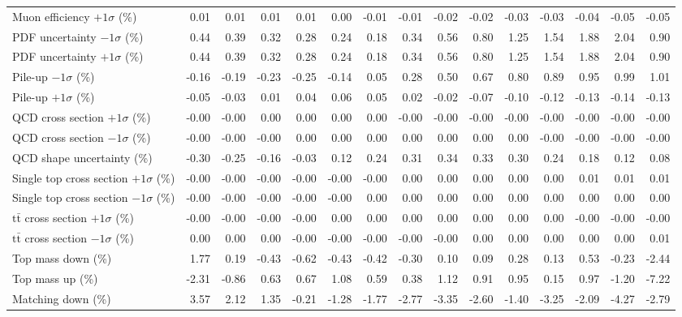 \begin{table}[htbp]
{\begin{tabular}{lrrrrrrrrrrrrrr}
Muon efficiency $+1\sigma$ (\%) & 0.01 & 0.01 & 0.01 & 0.01 & 0.00 & -0.01 & -0.01 & -0.02 & -0.02 & -0.03 & -0.03 & -0.04 & -0.05 & -0.05 \\ 
PDF uncertainty $-1\sigma$ (\%) & 0.44 & 0.39 & 0.32 & 0.28 & 0.24 & 0.18 & 0.34 & 0.56 & 0.80 & 1.25 & 1.54 & 1.88 & 2.04 & 0.90 \\ 
PDF uncertainty $+1\sigma$ (\%) & 0.44 & 0.39 & 0.32 & 0.28 & 0.24 & 0.18 & 0.34 & 0.56 & 0.80 & 1.25 & 1.54 & 1.88 & 2.04 & 0.90 \\ 
Pile-up $-1\sigma$ (\%) & -0.16 & -0.19 & -0.23 & -0.25 & -0.14 & 0.05 & 0.28 & 0.50 & 0.67 & 0.80 & 0.89 & 0.95 & 0.99 & 1.01 \\ 
Pile-up $+1\sigma$ (\%) & -0.05 & -0.03 & 0.01 & 0.04 & 0.06 & 0.05 & 0.02 & -0.02 & -0.07 & -0.10 & -0.12 & -0.13 & -0.14 & -0.13 \\ 
QCD cross section \ensuremath{+1\sigma} (\%) & -0.00 & -0.00 & 0.00 & 0.00 & 0.00 & 0.00 & -0.00 & -0.00 & -0.00 & -0.00 & -0.00 & -0.00 & -0.00 & -0.00 \\ 
QCD cross section \ensuremath{-1\sigma} (\%) & -0.00 & -0.00 & -0.00 & 0.00 & 0.00 & 0.00 & 0.00 & 0.00 & 0.00 & 0.00 & -0.00 & -0.00 & -0.00 & -0.00 \\ 
QCD shape uncertainty (\%) & -0.30 & -0.25 & -0.16 & -0.03 & 0.12 & 0.24 & 0.31 & 0.34 & 0.33 & 0.30 & 0.24 & 0.18 & 0.12 & 0.08 \\ 
Single top cross section $+1\sigma$ (\%) & -0.00 & -0.00 & -0.00 & -0.00 & -0.00 & -0.00 & 0.00 & 0.00 & 0.00 & 0.00 & 0.00 & 0.01 & 0.01 & 0.01 \\ 
Single top cross section $-1\sigma$ (\%) & -0.00 & -0.00 & -0.00 & -0.00 & -0.00 & 0.00 & 0.00 & 0.00 & 0.00 & 0.00 & 0.00 & 0.00 & 0.00 & 0.00 \\ 
$\mathrm{t}\bar{\mathrm{t}}$ cross section $+1\sigma$ (\%) & -0.00 & -0.00 & -0.00 & -0.00 & 0.00 & 0.00 & 0.00 & 0.00 & 0.00 & 0.00 & 0.00 & -0.00 & -0.00 & -0.00 \\ 
$\mathrm{t}\bar{\mathrm{t}}$ cross section $-1\sigma$ (\%) & 0.00 & 0.00 & 0.00 & -0.00 & -0.00 & -0.00 & -0.00 & -0.00 & 0.00 & 0.00 & 0.00 & 0.00 & 0.00 & 0.01 \\ 
Top mass down (\%) & 1.77 & 0.19 & -0.43 & -0.62 & -0.43 & -0.42 & -0.30 & 0.10 & 0.09 & 0.28 & 0.13 & 0.53 & -0.23 & -2.44 \\ 
Top mass up (\%) & -2.31 & -0.86 & 0.63 & 0.67 & 1.08 & 0.59 & 0.38 & 1.12 & 0.91 & 0.95 & 0.15 & 0.97 & -1.20 & -7.22 \\ 
Matching down (\%) & 3.57 & 2.12 & 1.35 & -0.21 & -1.28 & -1.77 & -2.77 & -3.35 & -2.60 & -1.40 & -3.25 & -2.09 & -4.27 & -2.79 \\ 

\end{tabular}}
\end{table}
